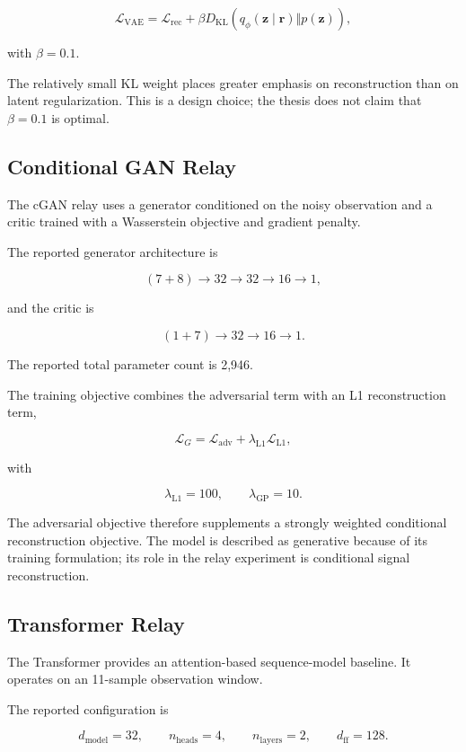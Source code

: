 \[
\mathcal L_{\mathrm{VAE}}
=
\mathcal L_{\mathrm{rec}}
+
\beta
D_{\mathrm{KL}}
\left(
q_\phi(\mathbf z\mid\mathbf r)
\Vert
p(\mathbf z)
\right),
\]

with $\beta=0.1$.

The relatively small KL weight places greater emphasis on
reconstruction than on latent regularization. This is a design choice;
the thesis does not claim that $\beta=0.1$ is optimal.


\subsection{Conditional GAN Relay}

The cGAN relay uses a generator conditioned on the noisy observation
and a critic trained with a Wasserstein objective and gradient penalty.

The reported generator architecture is

\[
(7+8)
\rightarrow
32
\rightarrow
32
\rightarrow
16
\rightarrow
1,
\]

and the critic is

\[
(1+7)
\rightarrow
32
\rightarrow
16
\rightarrow
1.
\]

The reported total parameter count is 2,946.

The training objective combines the adversarial term with an L1
reconstruction term,

\[
\mathcal L_G
=
\mathcal L_{\mathrm{adv}}
+
\lambda_{\mathrm{L1}}
\mathcal L_{\mathrm{L1}},
\]

with

\[
\lambda_{\mathrm{L1}}=100,
\qquad
\lambda_{\mathrm{GP}}=10.
\]

The adversarial objective therefore supplements a strongly weighted
conditional reconstruction objective. The model is described as
generative because of its training formulation; its role in the relay
experiment is conditional signal reconstruction.


\subsection{Transformer Relay}

The Transformer provides an attention-based sequence-model baseline.
It operates on an 11-sample observation window.

The reported configuration is

\[
d_{\mathrm{model}}=32,
\qquad
n_{\mathrm{heads}}=4,
\qquad
n_{\mathrm{layers}}=2,
\qquad
d_{\mathrm{ff}}=128.
\]

